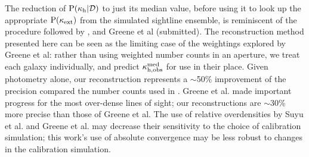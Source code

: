 \documentclass[useAMS,usenatbib,a4paper]{mn2e}
\begin{document}

The reduction of ${\rm P}(\kappa_{\rm h}|{\mathcal{D}})$ to just its median value, before using
it to look up the appropriate ${\rm P}(\kappa_{\rm ext})$ from the simulated sightline
ensemble, is reminiscent of the procedure followed by \citet{SuyuEtal2010},
and Greene et al (submitted). The reconstruction method presented here can be
seen as the limiting case of the weightings explored by Greene et al: rather
than using weighted number counts in an aperture, we treat each galaxy
individually, and predict $\kappa_{\rm h,obs}^{\rm med}$ for use in their
place. Given photometry alone, our reconstruction represents a $\sim$50\% improvement of
the precision compared the number counts used in \citet{SuyuEtal2010}. Greene et al.
made important progress for the most over-dense lines of sight; our
reconstructions are $\sim$30\% more precise than those of Greene et al.
The use of relative overdensities by Suyu et al. and Greene et al. may decrease 
their sensitivity to the choice of calibration simulation; this work's use of
absolute convergence may be less robust to changes in the calibration simulation. 
\end{document}
